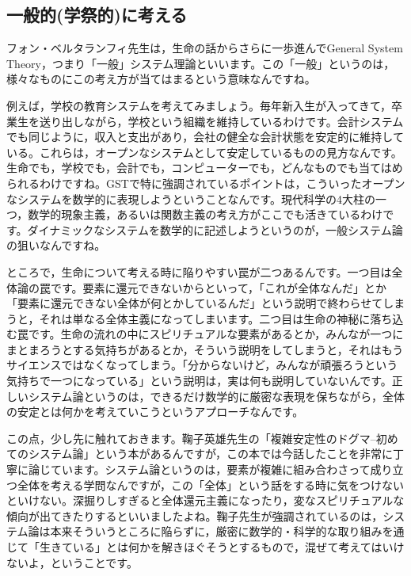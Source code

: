 \documentclass{ltjsbook}
\begin{document}
\subsection{一般的(学祭的)に考える}
フォン・ベルタランフィ先生は，生命の話からさらに一歩進んでGeneral System Theory，つまり「一般」システム理論といいます。この「一般」というのは，様々なものにこの考え方が当てはまるという意味なんですね。

例えば，学校の教育システムを考えてみましょう。毎年新入生が入ってきて，卒業生を送り出しながら，学校という組織を維持しているわけです。会計システムでも同じように，収入と支出があり，会社の健全な会計状態を安定的に維持している。これらは，オープンなシステムとして安定しているものの見方なんです。生命でも，学校でも，会計でも，コンピューターでも，どんなものでも当てはめられるわけですね。GSTで特に強調されているポイントは，こういったオープンなシステムを数学的に表現しようということなんです。現代科学の4大柱の一つ，数学的現象主義，あるいは関数主義の考え方がここでも活きているわけです。ダイナミックなシステムを数学的に記述しようというのが，一般システム論の狙いなんですね。

ところで，生命について考える時に陥りやすい罠が二つあるんです。一つ目は全体論の罠です。要素に還元できないからといって，「これが全体なんだ」とか「要素に還元できない全体が何とかしているんだ」という説明で終わらせてしまうと，それは単なる全体主義になってしまいます。二つ目は生命の神秘に落ち込む罠です。生命の流れの中にスピリチュアルな要素があるとか，みんなが一つにまとまろうとする気持ちがあるとか，そういう説明をしてしまうと，それはもうサイエンスではなくなってしまう。「分からないけど，みんなが頑張ろうという気持ちで一つになっている」という説明は，実は何も説明していないんです。正しいシステム論というのは，できるだけ数学的に厳密な表現を保ちながら，全体の安定とは何かを考えていこうというアプローチなんです。

この点，少し先に触れておきます。鞠子英雄先生の「複雑安定性のドグマ--初めてのシステム論」\parencite{Mariko199602}という本があるんですが，この本では今話したことを非常に丁寧に論じています。システム論というのは，要素が複雑に組み合わさって成り立つ全体を考える学問なんですが，この「全体」という話をする時に気をつけないといけない。深掘りしすぎると全体還元主義になったり，変なスピリチュアルな傾向が出てきたりするといいましたよね。鞠子先生が強調されているのは，システム論は本来そういうところに陥らずに，厳密に数学的・科学的な取り組みを通じて「生きている」とは何かを解きほぐそうとするもので，混ぜて考えてはいけないよ，ということです。
\end{document}
